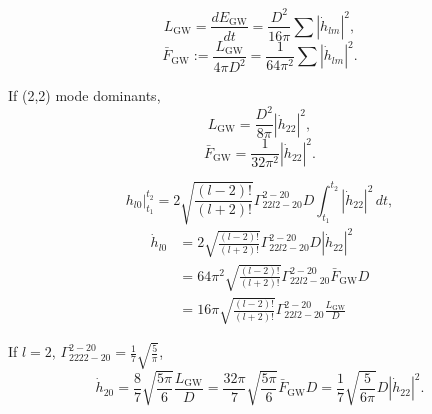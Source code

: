 \documentclass{ctexbeamer}
\begin{document}
    \begin{frame}
        \begin{equation}
            L_\text{GW}=\frac{d E_\text{GW}}{dt}
            =\frac{D^2}{16\pi}\sum\left\lvert \dot{h}_{lm}\right\rvert^2,
        \end{equation}
        \begin{equation}
            \bar{F}_\text{GW}:=\frac{L_\text{GW}}{4\pi D^2}=\frac{1}{64\pi^2}\sum\left\lvert \dot{h}_{lm}\right\rvert^2.
        \end{equation}

        If (2,2) mode dominants,
        \begin{equation}
            L_\text{GW}=\frac{D^2}{8\pi}\left\lvert\dot{h}_{22}\right\rvert^2,
        \end{equation}
        \begin{equation}
            \bar{F}_\text{GW}=\frac{1}{32\pi^2}\left\lvert\dot{h}_{22}\right\rvert^2.
        \end{equation}
    \end{frame}
    \begin{frame}
        \begin{equation*}
            h_{l0}\vert_{t_1}^{t_2}=2\sqrt{\frac{(l-2)!}{(l+2)!}}\Gamma^{2-20}_{22l2-20}D\!\int_{t_1}^{t_2}\left\lvert\dot{h}_{22}\right\rvert^2\,dt,
        \end{equation*}
        \begin{align}
            \dot{h}_{l0}&=2\sqrt{\frac{(l-2)!}{(l+2)!}}\Gamma^{2-20}_{22l2-20}D\left\lvert\dot{h}_{22}\right\rvert^2\\
            &=64\pi^2\sqrt{\frac{(l-2)!}{(l+2)!}}\Gamma^{2-20}_{22l2-20}\bar{F}_\text{GW}D\\
            &=16\pi\sqrt{\frac{(l-2)!}{(l+2)!}}\Gamma^{2-20}_{22l2-20}\frac{L_\text{GW}}{D}
        \end{align}
    \end{frame}
    \begin{frame}
        If $l=2$, $\Gamma^{2-20}_{2222-20}=\frac{1}{7}\sqrt{\frac{5}{\pi}}$,
        \begin{equation}
            \dot{h}_{20}
            =\frac{8}{7}\sqrt{\frac{5\pi}{6}}\frac{L_\text{GW}}{D}
            =\frac{32\pi}{7}\sqrt{\frac{5\pi}{6}}\bar{F}_\text{GW}D
            =\frac{1}{7}\sqrt{\frac{5}{6\pi}}D\left\lvert\dot{h}_{22}\right\rvert^2.
        \end{equation}
    \end{frame}
\end{document}
